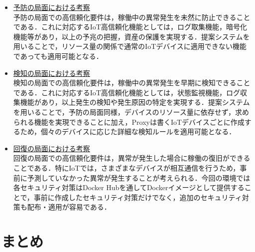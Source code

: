 \documentclass[Japanese]{dicomopapers}
\begin{document}
\begin{itemize}
	\item \underline{予防の局面における考察}\mbox{}\\
	      予防の局面での高信頼化要件は，稼働中の異常発生を未然に防止できることである．これに対応するIoT高信頼化機能としては，ログ取集機能，暗号化機能等があり，以上の予兆の把握，資産の保護を実現する．提案システムを用いることで，リソース量の関係で通常のIoTデバイスに適用できない機能であっても適用可能となる．
	\item \underline{検知の局面における考察}\mbox{}\\
	      検知の局面での高信頼化要件は，稼働中の異常発生を早期に検知できることである．これに対応するIoT高信頼化機能としては，状態監視機能，ログ収集機能があり，以上発生の検知や発生原因の特定を実現する．提案システムを用いることで，予防の局面同様，デバイスのリソース量に依存せず，求められる機能を実現できることに加え，Proxyは書くIoTデバイスごとに作成するため，個々のデバイスに応じた詳細な検知ルールを適用可能となる．
	\item \underline{回復の局面における考察}\mbox{}\\
	      回復の局面での高信頼化要件は，異常が発生した場合に稼働の復旧ができることである．特にIoTでは，さまざまなデバイスが相互通信を行うため，事前に予測していなかった異常が発生することが考えられる．今回の環境では各セキュリティ対策はDocker Hubを通してDockerイメージとして提供することで，事前に作成したセキュリティ対策だけでなく，追加のセキュリティ対策も配布・適用が容易である．
\end{itemize}

\section{まとめ}
\end{document}
